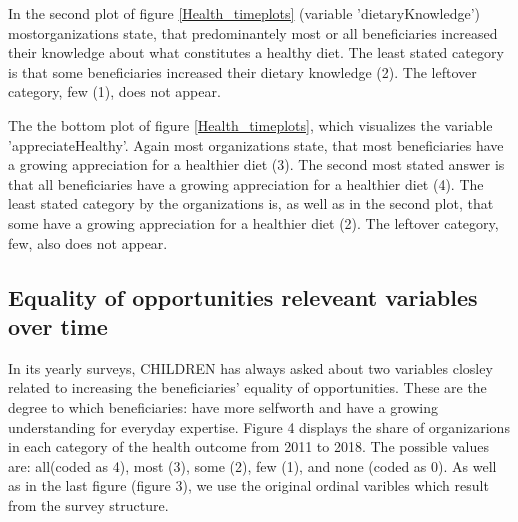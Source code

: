 \documentclass[12pt, a4paper, titlepage]{article}\usepackage[]{graphicx}\usepackage[]{color}
\begin{document}
In the second plot of figure \ref{Health_timeplots} (variable 'dietaryKnowledge') mostorganizations state, that predominantely most or all beneficiaries increased their knowledge about what constitutes a healthy diet. The least stated category is that some beneficiaries increased their dietary knowledge (2). The leftover category, few (1), does not appear.

The the bottom plot of figure \ref{Health_timeplots}, which visualizes the variable 'appreciateHealthy'. Again most organizations state, that most beneficiaries have a growing appreciation for a healthier diet (3). The second most stated answer is that all beneficiaries have a growing appreciation for a healthier diet (4). The least stated category by the organizations is, as well as in the second plot, that some have a growing appreciation for a healthier diet (2). The leftover category, few, also does not appear.


\subsection{Equality of opportunities releveant variables over time} 

In its yearly surveys, CHILDREN has always asked about two variables closley related to increasing the beneficiaries' equality of opportunities. These are the degree to which beneficiaries: have more selfworth and have a growing understanding for everyday expertise. Figure 4 displays the share of organizarions in each category of the health outcome from 2011 to 2018. The possible values are: all(coded as 4), most (3), some (2), few (1), and none (coded as 0). As well as in the last figure (figure 3), we use the original ordinal varibles which result from the survey structure.
\end{document}
